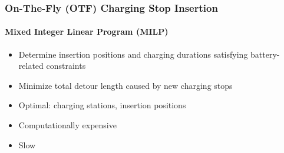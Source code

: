 \documentclass[aspectratio=1610]{beamer}
\begin{document}
\begin{frame}
  \frametitle{On-The-Fly (OTF) Charging Stop Insertion}
  \framesubtitle{Mixed Integer Linear Program (MILP)}
  
\begin{itemize}
	\item Determine insertion positions and charging durations satisfying battery-related constraints 
	\item Minimize total detour length caused by new charging stops %
\end{itemize} 

\bigskip

\begin{itemize}
	\item Optimal: charging stations, insertion positions
\end{itemize}

\bigskip

\begin{itemize}
	\item Computationally expensive 
	\item Slow
\end{itemize}

\end{frame}
\end{document}
